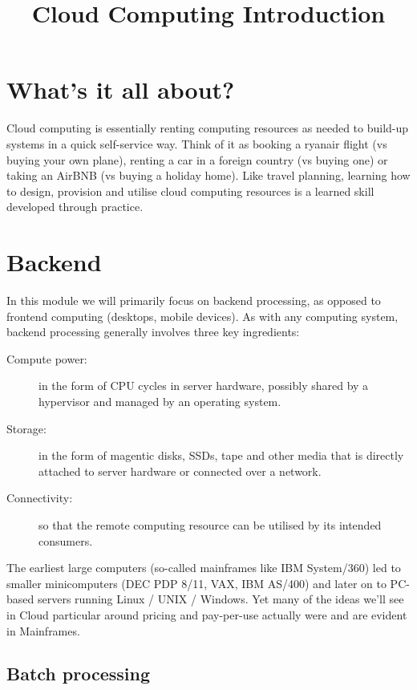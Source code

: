 \documentclass{pgnotes}
\title{Cloud Computing Introduction}
\begin{document}
\maketitle

\section{What's it all about?}
\label{sec:whats-it-all-about}

Cloud computing is essentially renting computing resources as needed to build-up systems in a quick self-service way.
Think of it as booking a ryanair flight (vs buying your own plane), renting a car in a foreign country (vs buying one) or taking an AirBNB (vs buying a holiday home).
Like travel planning, learning how to design, provision and utilise cloud computing resources is a learned skill developed through practice.

\section{Backend}
\label{sec:backend}

In this module we will primarily focus on backend processing, as opposed to frontend computing (desktops, mobile devices).
As with any computing system, backend processing generally involves three key ingredients:
\begin{description}
\item[Compute power:] in the form of CPU cycles in server hardware, possibly shared by a hypervisor and managed by an operating system.
\item[Storage:] in the form of magentic disks, SSDs, tape and other media that is directly attached to server hardware or connected over a network. 
\item[Connectivity:] so that the remote computing resource can be utilised by its intended consumers.
\end{description}

The earliest large computers (so-called mainframes like IBM System/360) led to smaller minicomputers (DEC PDP 8/11, VAX, IBM AS/400) and later on to PC-based servers running Linux / UNIX / Windows.
Yet many of the ideas we'll see in Cloud particular around pricing and pay-per-use actually were and are evident in Mainframes. 

\subsection{Batch processing}
\label{sec:batch-processing}
\end{document}
